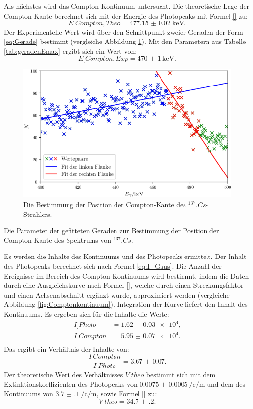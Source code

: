\newpage
\noindent Als nächstes wird das Compton-Kontinuum untersucht. Die theoretische Lage der Compton-Kante berechnet sich mit der Energie des Photopeaks mit Formel \eqref{} zu:
\[
E_.{Compton,Theo} = \SI{477.15(2)}{\kilo\electronvolt}\text{.}
\]
Der Experimentelle Wert wird über den Schnittpunkt zweier Geraden der Form \eqref{eq:Gerade} bestimmt (vergleiche  Abbildung \ref{fig:Emax}). Mit den Parametern aus Tabelle \ref{tab:geradenEmax} ergibt sich ein Wert von:
\[
E_.{Compton,Exp} = \SI{470(1)}{\kilo\electronvolt}\text{.}
\]

\begin{figure}
	\centering
	\includegraphics[width=\linewidth-70pt,height=\textheight-70pt,keepaspectratio]{content/images/Cs137Emax.png}
	\caption{Die Bestimmung der Position der Compton-Kante des $^{137}.{Cs}$-Strahlers.}
	\label{fig:Emax}
\end{figure}

\begin{table}
	\centering
	\caption{Die Parameter der gefitteten Geraden zur Bestimmung der Position der Compton-Kante des Spektrums von $^{137}.{Cs}$.}
	
	\label{tab:geradenEmax}
\end{table}

\newpage
\noindent Es werden die Inhalte des Kontinuums und des Photopeaks ermittelt. Der Inhalt des Photopeaks berechnet sich nach Formel \eqref{eq:I_Gaus}. Die Anzahl der Ereignisse im Bereich des Compton-Kontinuums wird bestimmt, indem die Daten durch eine Ausgleichskurve nach Formel \eqref{}, welche durch einen Streckungsfaktor und einen Achsenabschnitt ergänzt wurde, approximiert werden (vergleiche Abbildung \ref{fig:Comptonkontinuum}). Integration der Kurve liefert den Inhalt des Kontinuums.
Es ergeben sich für die Inhalte die Werte:
\begin{align*}
I_.{Photo} 	 &= \num{1.62(3)e4}\text{,}\\
I_.{Compton} &= \num{5.95(7)e4}\text{.}\\
\end{align*} 
Das ergibt ein Verhältnis der Inhalte von:
\[
\frac{I_.{Compton}}{I_.{Photo}} = \num{3.67(7)}\text{.}
\]
Der theoretische Wert des Verhältnisses $V_.{theo}$ bestimmt sich mit dem Extinktionskoeffizienten des Photopeaks von $\SI{0.0075(5)}{\per\centi\per\metre}$ und dem des Kontinuums von $\SI{3.7(1)}{\per\centi\per\metre}$, sowie Formel \eqref{} zu: 
\[
V_.{theo} = \num{34.7(2)}\text{.}
\]

